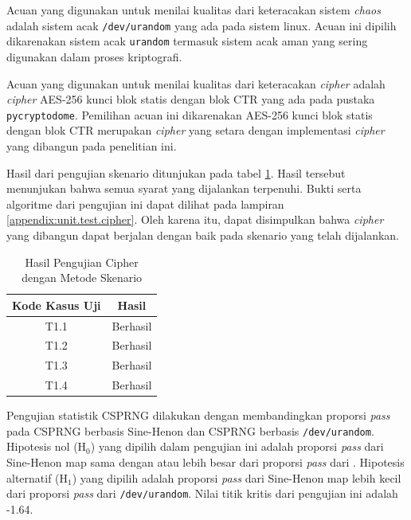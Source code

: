 Acuan yang digunakan untuk menilai kualitas dari keteracakan sistem \emph{chaos} adalah sistem acak \texttt{/dev/urandom} yang ada pada sistem linux. Acuan ini dipilih dikarenakan sistem acak \texttt{urandom} termasuk sistem acak aman yang sering digunakan dalam proses kriptografi. 

Acuan yang digunakan untuk menilai kualitas dari keteracakan \emph{cipher} adalah \emph{cipher} AES-256 kunci blok statis dengan blok CTR yang ada pada pustaka \texttt{pycryptodome}. Pemilihan acuan ini dikarenakan AES-256 kunci blok statis dengan blok CTR merupakan \emph{cipher} yang setara dengan implementasi \emph{cipher} yang dibangun pada penelitian ini.

Hasil dari pengujian skenario ditunjukan pada tabel \ref{tab:test.result.cipher}. Hasil tersebut menunjukan bahwa semua syarat yang dijalankan terpenuhi. Bukti serta algoritme dari pengujian ini dapat dilihat pada lampiran \ref{appendix:unit.test.cipher}. Oleh karena itu, dapat disimpulkan bahwa \emph{cipher} yang dibangun dapat berjalan dengan baik pada skenario yang telah dijalankan.

\begin{table}[!h]
  \centering
  \caption{Hasil Pengujian Cipher dengan Metode Skenario} \label{tab:test.result.cipher}
  \begin{tabular}{|c|c|}
    \hline
    Kode Kasus Uji & Hasil \\ \hline
    T1.1 & Berhasil \\ \hline
    T1.2 & Berhasil \\ \hline
    T1.3 & Berhasil \\ \hline
    T1.4 & Berhasil \\ \hline
  \end{tabular}
\end{table}

Pengujian statistik CSPRNG dilakukan dengan membandingkan proporsi \emph{pass} pada CSPRNG berbasis Sine-Henon dan CSPRNG berbasis \texttt{/dev/urandom}. Hipotesis nol ($\text{H}_0$) yang dipilih dalam pengujian ini adalah proporsi \emph{pass} dari Sine-Henon map sama dengan atau lebih besar dari proporsi \emph{pass} dari \text. Hipotesis alternatif ($\text{H}_1$) yang dipilih adalah proporsi \emph{pass} dari Sine-Henon map lebih kecil dari proporsi \emph{pass} dari \texttt{/dev/urandom}. Nilai titik kritis dari pengujian ini adalah -1.64.

